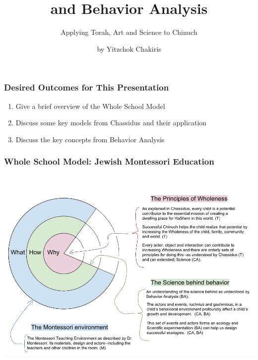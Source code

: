 \documentclass[12pt, handout, notes=show]{beamer}
\title{\Huge{\RL{\sbl חסידות} and Behavior Analysis}}
\subtitle{Applying Torah, Art and Science to Chinuch }
\author{by Yitzchok Chakiris}
\date{\RL{\sbl  ה'תשע''ז}}
\begin{document}
\maketitle

\begin{frame}
  \frametitle{Desired Outcomes for This Presentation}
  \begin{enumerate}
  \item Give a brief overview of the Whole School Model

  \item Discuss some key models from Chassidus and their application
  \item Discuss the key concepts from Behavior Analysis

  \end{enumerate}

\end{frame}


\begin{frame}
  \frametitle{Whole School Model: Jewish Montessori Education}
  \begin{center}
      \includegraphics[scale=0.38]{graphics/onion-model-v2.png}
  \end{center}
\end{frame}
\end{document}
